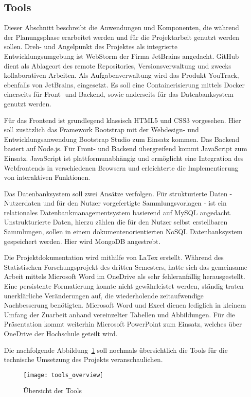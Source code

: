 \subsection{Tools}\label{subsec:Tools}
Dieser Abschnitt beschreibt die Anwendungen und Komponenten, die während der Planungsphase erarbeitet werden und für die Projektarbeit genutzt werden sollen.
Dreh- und Angelpunkt des Projektes als integrierte Entwicklungsumgebung ist WebStorm der Firma JetBrains angedacht.
GitHub dient als Ablageort des remote Repositories, Versionsverwaltung und zwecks kollaborativen Arbeiten.
Als Aufgabenverwaltung wird das Produkt YouTrack, ebenfalls von JetBrains, eingesetzt.
Es soll eine Containerisierung mittels Docker einerseits für Front- und Backend, sowie anderseits für das Datenbanksystem genutzt werden.

Für das Frontend ist grundlegend klassisch HTML5 und CSS3 vorgesehen.
Hier soll zusätzlich das Framework Bootstrap mit der Webdesign- und Entwicklungsanwendung Bootstrap Studio zum Einsatz kommen.
Das Backend basiert auf Node.js.
Für Front- und Backend übergreifend kommt JavaScript zum Einsatz.
JavaScript ist plattformunabhängig und ermöglicht eine Integration des Webfrontends in verschiedenen Browsern und erleichterte die Implementierung von interaktiven Funktionen.

Das Datenbanksystem soll zwei Ansätze verfolgen.
Für strukturierte Daten - Nutzerdaten und für den Nutzer vorgefertigte Sammlungsvorlagen - ist ein relationales Datenbankmanagementsystem basierend auf MySQL angedacht.
Unstrukturierte Daten, hierzu zählen die für den Nutzer selbst erstellbaren Sammlungen, sollen in einem dokumentenorientierten NoSQL Datenbanksystem gespeichert werden.
Hier wird MongoDB angestrebt.

Die Projektdokumentation wird mithilfe von LaTex erstellt.
Während des Statistischen Forschungsprojekt des dritten Semesters, hatte sich das gemeinsame Arbeit mittels Microsoft Word im OneDrive als sehr fehleranfällig herausgestellt.
Eine persistente Formatierung konnte nicht gewährleistet werden, ständig traten unerklärliche Veränderungen auf, die wiederholende zeitaufwendige Nachbesserung benötigten.
Microsoft Word und Excel dienen lediglich in kleinem Umfang der Zuarbeit anhand vereinzelter Tabellen und Abbildungen.
Für die Präsentation kommt weiterhin Microsoft PowerPoint zum Einsatz, welches über OneDrive der Hochschule geteilt wird.

Die nachfolgende Abbildung~\ref{fig:uebersicht-tools} soll nochmals übersichtlich die Tools für die technische Umsetzung des Projekts veranschaulichen.

\begin{figure}[H]
    \centering
    \texttt{[image: tools\_overview]}
    \caption{Übersicht der Tools}\label{fig:uebersicht-tools}
\end{figure}
